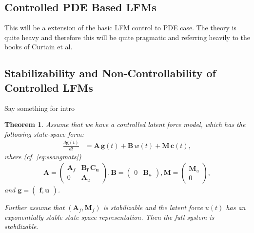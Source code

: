 \documentclass[journal]{IEEEtran}
\newtheorem{theorem}{Theorem}[section]
\newcommand{\simo}[1]{{\color{red}#1}}
\begin{document}
\subsection{Controlled PDE Based LFMs}
%
\simo{This will be a extension of the basic LFM control to PDE case. The theory is quite heavy and therefore this will be quite pragmatic and referring heavily to the books of Curtain et al.}

\subsection{Stabilizability and Non-Controllability of Controlled LFMs}
%
\simo{Say something for intro}

\begin{theorem} \label{the:stab}
Assume that we have a controlled latent force model, which has the following state-space form:
%
\begin{equation}
\begin{split}
  \frac{d\mathbf{g}(t)}{dt}
  &= \mathbf{A} \, \mathbf{g}(t)
  + \mathbf{B} \, w(t) + \mathbf{M} \, \mathbf{c}(t),
\end{split}
\end{equation}
%
where (cf. \eqref{eq:ssaugmats})
%
\begin{equation}
\begin{split}
  \mathbf{A}
  = \begin{pmatrix}
	\mathbf{A}_f & \mathbf{\mathbf{B}_f \, \mathbf{C}_u} \\
	0 & \mathbf{A}_u
  \end{pmatrix}, 
  \mathbf{B}
  = \begin{pmatrix}
	0 & \mathbf{B}_u
  \end{pmatrix}, 
  \mathbf{M} = \begin{pmatrix} \mathbf{M}_u \\ 0 \end{pmatrix},
\end{split}
\end{equation}
%
and $\mathbf{g} = \begin{pmatrix} \mathbf{f}, \mathbf{u} \end{pmatrix}$.

Further assume that $(\mathbf{A}_f,\mathbf{M}_f)$ is stabilizable and the latent force $u(t)$ has an exponentially stable state space representation. Then the full system is \emph{stabilizable}.
\end{theorem}
\end{document}

